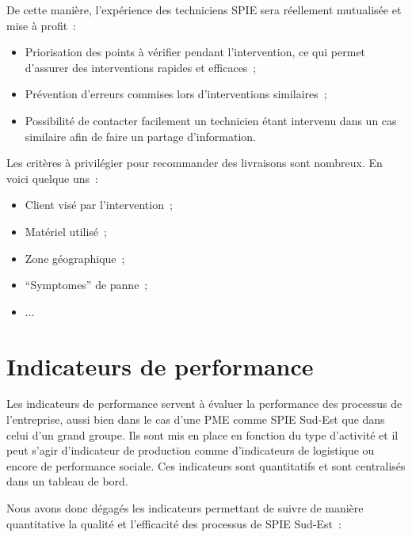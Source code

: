             De cette manière, l'expérience des techniciens SPIE sera réellement mutualisée et mise à profit~:

            \begin{itemize}
                \item Priorisation des points à vérifier pendant l'intervention, ce qui permet d'assurer des interventions rapides et efficaces~;
                \item Prévention d'erreurs commises lors d'interventions similaires~;
                \item Possibilité de contacter facilement un technicien étant intervenu dans un cas similaire afin de faire un partage d'information.
            \end{itemize}

            Les critères à privilégier pour recommander des livraisons sont nombreux. En voici quelque uns~:
            \begin{itemize}
                \item Client visé par l'intervention~;
                \item Matériel utilisé~;
                \item Zone géographique~;
                \item ``Symptomes'' de panne~;
                \item ...
            \end{itemize}

\section{Indicateurs de performance}

    Les indicateurs de performance servent à évaluer la performance des processus de l'entreprise, aussi bien dans le cas d'une PME comme SPIE Sud-Est que dans celui d'un grand groupe. Ils sont mis en place en fonction du type d'activité et il peut s'agir d'indicateur de production comme d'indicateurs de logistique ou encore de performance sociale. Ces indicateurs sont quantitatifs et sont centralisés dans un tableau de bord.

    Nous avons donc dégagés les indicateurs permettant de suivre de manière quantitative la qualité et l'efficacité des processus de SPIE Sud-Est~:

